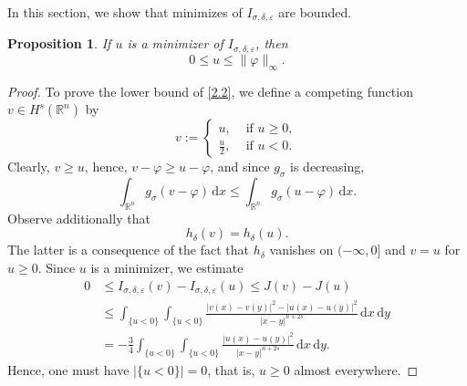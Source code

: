 \documentclass[11pt, reqno]{amsart}
\newtheorem{proposition}{Proposition}
\numberwithin{equation}{section}
\numberwithin{theorem}{section}
\numberwithin{lemma}{section}
\numberwithin{corollary}{section}
\numberwithin{remark}{section}
\numberwithin{proposition}{section}
\numberwithin{definition}{section}
\newcommand{\R}{\mathbb{R}}
\begin{document}
In this section, we show that minimizes of $I_{\sigma,\delta,\varepsilon}$ are bounded.
\begin{proposition}\label{p2.1}
If $u$ is a minimizer of $I_{\sigma,\delta,\varepsilon}$, then 
\begin{equation}\label{2.2}
0\le u \le \| \varphi\|_\infty.
\end{equation}
\end{proposition} 
\begin{proof}	
	To prove the lower bound of \eqref{2.2}, we define a competing function $v\in H^s(\R^n)$ by
	\begin{equation*}
	v:= \begin{cases}
	u, & \text{ if }u\ge0,\\
	\frac{u}{2}, & \text{ if } u<0.
	\end{cases}
	\end{equation*}
	Clearly, $v\ge u$, hence, $v-\varphi\ge u-\varphi$, and since $g_{\sigma}$ is decreasing,
	$$
	\int_{\R^n} g_\sigma(v-\varphi)\,\mathrm{d}x\le\int_{\R^n}  g_\sigma(u-\varphi)\,\mathrm{d}x.
	$$
	Observe additionally that  
	$$
	h_\delta(v)=h_\delta(u).
	$$ 
	The latter is a consequence of the fact that $h_\delta$ vanishes on $(-\infty,0]$ and $v=u$ for $u\ge0$. Since $u$ is a minimizer, we estimate
	\begin{align*}
	0 &\le I_{\sigma,\delta,\varepsilon}(v)-I_{\sigma,\delta,\varepsilon}(u)\leq J(v)-J(u)\\
	&\le\int_{\{u<0\}}\int_{\{u<0\}}\frac{|v(x)-v(y)|^2-|u(x)-u(y)|^2}{|x-y|^{n+2s}}\,\mathrm{d}x\,\mathrm{d}y\\
	&=-\frac{3}{4}\int_{\{u<0\}}\int_{\{u<0\}}\frac{|u(x)-u(y)|^2}{|x-y|^{n+2s}}\,\mathrm{d}x\,\mathrm{d}y.
	\end{align*}
	Hence, one must have $|\{u<0\}|=0$, that is, $u\ge0$ almost everywhere.	
	

\end{proof}
\end{document}
